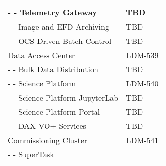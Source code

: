 \begin{longtable}{|p{}|p{}|}
- - Telemetry Gateway & TBD \\ \hline
- - Image and EFD Archiving & TBD \\ \hline
- - OCS Driven Batch Control & TBD \\ \hline
\rowcolor{orange}
Data Access Center  & LDM-539 \\ \hline
- - Bulk Data Distribution & TBD \\ \hline
\rowcolor{yellow}
- - Science Platform & LDM-540 \\ \hline
- - Science Platform JupyterLab & TBD \\ \hline
- - Science Platform Portal & TBD \\ \hline
- - DAX VO+ Services & TBD \\ \hline
\rowcolor{orange}
Commissioning Cluster  & LDM-541 \\ \hline
- - SuperTask &  \\ \hline
\end{longtable}
